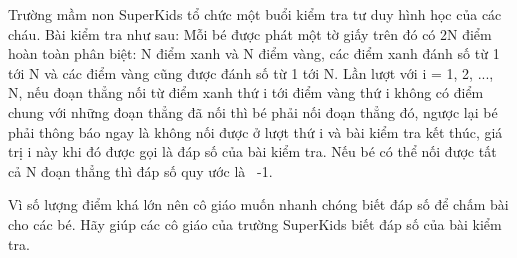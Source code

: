 Trường mầm non SuperKids tổ chức một buổi kiểm tra tư duy hình học của các cháu. Bài kiểm tra như sau: Mỗi bé được phát một tờ giấy trên đó có 2N điểm hoàn toàn phân biệt: N điểm xanh và N điểm vàng, các điểm xanh đánh số từ 1 tới N và các điểm vàng cũng được đánh số từ 1 tới N. Lần lượt với i = 1, 2, ..., N, nếu đoạn thẳng nối từ điểm xanh thứ i tới điểm vàng thứ i không có điểm chung với những đoạn thẳng đã nối thì bé phải nối đoạn thẳng đó, ngược lại bé phải thông báo ngay là không nối được ở lượt thứ i và bài kiểm tra kết thúc, giá trị i này khi đó được gọi là đáp số của bài kiểm tra. Nếu bé có thể nối được tất cả N đoạn thẳng thì đáp số quy ước là  -1.  

   Vì số lượng điểm khá lớn nên cô giáo muốn nhanh chóng biết đáp số để chấm bài cho các bé. Hãy giúp các cô giáo của trường SuperKids biết đáp số của bài kiểm tra.  

\
